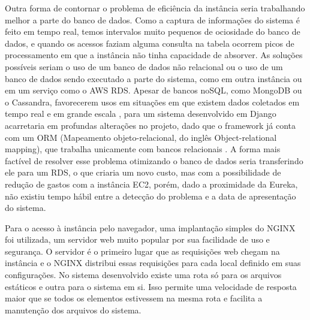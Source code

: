 \indent
\par Outra forma de contornar o problema de eficiência da instância seria trabalhando melhor a parte do banco de dados. Como a captura de informações do sistema é feito em tempo real, temos intervalos muito pequenos de ociosidade do banco de dados, e quando os acessos faziam alguma consulta na tabela ocorrem picos de processamento em que a instância não tinha capacidade de absorver. As soluções possíveis seriam o uso de um banco de dados não relacional ou o uso de um banco de dados sendo executado a parte do sistema, como em outra instância ou em um serviço como o AWS RDS. Apesar de bancos noSQL, como MongoDB ou o Cassandra, favorecerem usos em situações em que existem dados coletados em tempo real e em grande escala \cite{MongoDB}, para um sistema desenvolvido em Django acarretaria em profundas alterações no projeto, dado que o framework já conta com um ORM (Mapeamento objeto-relacional, do inglês Object-relational mapping), que trabalha unicamente com bancos relacionais \cite{Alura}. A forma mais factível de resolver esse problema otimizando o banco de dados seria transferindo ele para um RDS, o que criaria um novo custo, mas com a possibilidade de redução de gastos com a instância EC2, porém, dado a proximidade da Eureka, não existiu tempo hábil entre a detecção do problema e a data de apresentação do sistema.
\par Para o acesso à instância pelo navegador, uma implantação simples do NGINX \cite{NGINX} foi utilizada, um servidor web muito popular por sua facilidade de uso e segurança. O servidor é o primeiro lugar que as requisições web chegam na instância e o NGINX distribui essas requisições para cada local definido em suas configurações. No sistema desenvolvido existe uma rota só para os arquivos estáticos e outra para o sistema em si. Isso permite uma velocidade de resposta maior que se todos os elementos estivessem na mesma rota e facilita a manutenção dos arquivos do sistema.




